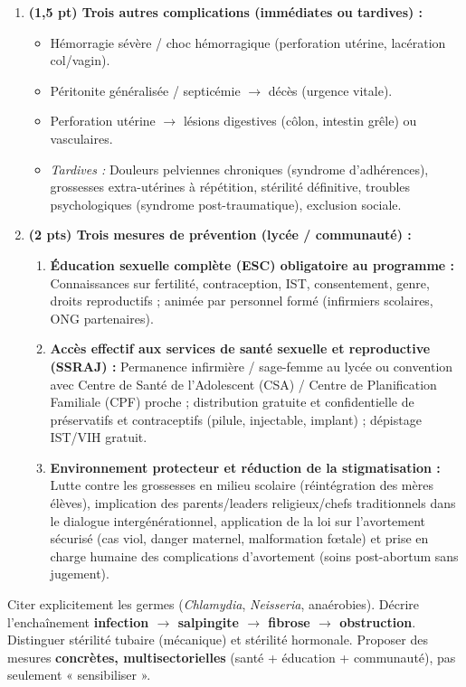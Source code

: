 \documentclass[11pt]{article}
\begin{document}
\begin{corrige}
\begin{enumerate}[itemsep=6pt]
\begin{enumerate}
\end{enumerate}
\item \textbf{(1,5 pt) Trois autres complications (immédiates ou tardives) :}
\begin{itemize}
\item Hémorragie sévère / choc hémorragique (perforation utérine, lacération col/vagin).
\item Péritonite généralisée / septicémie $\rightarrow$ décès (urgence vitale).
\item Perforation utérine $\rightarrow$ lésions digestives (côlon, intestin grêle) ou vasculaires.
\item \emph{Tardives :} Douleurs pelviennes chroniques (syndrome d'adhérences), grossesses extra-utérines à répétition, stérilité définitive, troubles psychologiques (syndrome post-traumatique), exclusion sociale.
\end{itemize}
\item \textbf{(2 pts) Trois mesures de prévention (lycée / communauté) :}
\begin{enumerate}
\item \textbf{Éducation sexuelle complète (ESC) obligatoire au programme :} Connaissances sur fertilité, contraception, IST, consentement, genre, droits reproductifs ; animée par personnel formé (infirmiers scolaires, ONG partenaires).
\item \textbf{Accès effectif aux services de santé sexuelle et reproductive (SSRAJ) :} Permanence infirmière / sage-femme au lycée ou convention avec Centre de Santé de l'Adolescent (CSA) / Centre de Planification Familiale (CPF) proche ; distribution gratuite et confidentielle de préservatifs et contraceptifs (pilule, injectable, implant) ; dépistage IST/VIH gratuit.
\item \textbf{Environnement protecteur et réduction de la stigmatisation :} Lutte contre les grossesses en milieu scolaire (réintégration des mères élèves), implication des parents/leaders religieux/chefs traditionnels dans le dialogue intergénérationnel, application de la loi sur l'avortement sécurisé (cas viol, danger maternel, malformation fœtale) et prise en charge humaine des complications d'avortement (soins post-abortum sans jugement).
\end{enumerate}
\end{enumerate}
\begin{aretenir}
Citer explicitement les germes (\emph{Chlamydia}, \emph{Neisseria}, anaérobies). Décrire l'enchaînement \textbf{infection $\rightarrow$ salpingite $\rightarrow$ fibrose $\rightarrow$ obstruction}. Distinguer stérilité tubaire (mécanique) et stérilité hormonale. Proposer des mesures \textbf{concrètes, multisectorielles} (santé + éducation + communauté), pas seulement « sensibiliser ».
\end{aretenir}
\end{corrige}
\end{document}
